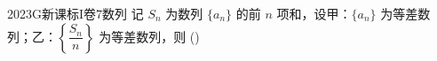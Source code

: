 
\begin{problem}{2023}{G}{新课标I卷}{7}{数列}
记 $S_n$ 为数列 $\{a_n\}$ 的前 $n$ 项和，设甲：$\{a_n\}$ 为等差数列；乙：$\left\{\dfrac{S_n}{n}\right\}$ 为等差数列，则
(\hspace{1cm})
\begin{choices}
\end{choices}
\end{problem}